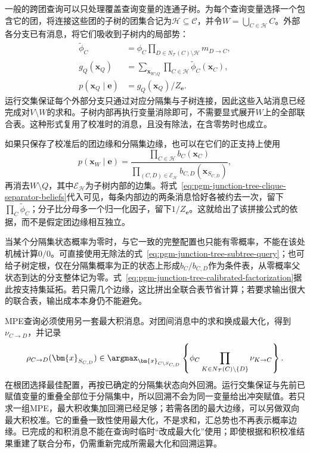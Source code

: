 一般的跨团查询可以只处理覆盖查询变量的连通子树。为每个查询变量选择一个包含它的团，将连接这些团的子树的团集合记为$\mathcal{H}\subseteq\mathcal{C}$，并令$W=\bigcup_{C\in\mathcal{H}}C$。外部各分支已有消息，将它们吸收到子树内的局部势：
\begin{equation}
  \begin{aligned}
    \widetilde{\phi}_C
      &=\phi_C
        \prod_{D\in N_{\mathcal{T}}(C)\setminus\mathcal{H}}m_{D\to C},\\
    g_Q(\bm{x}_Q)
      &=\sum_{\bm{x}_{W\setminus Q}}
         \prod_{C\in\mathcal{H}}\widetilde{\phi}_C(\bm{x}_C),\\
    p(\bm{x}_Q\mid\bm{e})&=g_Q(\bm{x}_Q)/Z_{\bm{e}}.
  \end{aligned}
  \label{eq:pgm-junction-tree-subtree-query}
\end{equation}
运行交集保证每个外部分支只通过对应分隔集与子树连接，因此这些入站消息已经完成对$V\setminus W$的求和。子树内部再执行变量消除即可，不需要显式展开$W$上的全部联合表。这种形式复用了校准时的消息，且没有除法，在含零势时也成立。

如果只保存了校准后的团边缘和分隔集边缘，也可以在它们的正支持上使用
\begin{equation}
  p(\bm{x}_W\mid\bm{e})
    =\frac{\prod_{C\in\mathcal{H}}b_C(\bm{x}_C)}
           {\prod_{(C,D)\in\mathcal{E}_{\mathcal{H}}}
                b_{C,D}(\bm{x}_{S_{C,D}})},
  \label{eq:pgm-junction-tree-calibrated-factorization}
\end{equation}
再消去$W\setminus Q$，其中$\mathcal{E}_{\mathcal{H}}$为子树内部的边集。将式~\eqref{eq:pgm-junction-tree-clique-separator-beliefs}代入可见，每条内部边的两条消息恰好各被约去一次，留下$\prod_C\widetilde{\phi}_C$；分子比分母多一个归一化因子，留下$1/Z_{\bm{e}}$。这就给出了该拼接公式的依据，而不是假定团边缘相互独立。

当某个分隔集状态概率为零时，与它一致的完整配置也只能有零概率，不能在该处机械计算$0/0$。可直接使用无除法的式~\eqref{eq:pgm-junction-tree-subtree-query}；也可给子树定根，仅在分隔集概率为正的状态上形成$b_C/b_{C,D}$作为条件表，从零概率父状态到达的分支整体记为零。式~\eqref{eq:pgm-junction-tree-calibrated-factorization}据此按支持集延拓。若只需几个边缘，这比拼出全联合表节省计算；若要求输出很大的联合表，输出成本本身仍不能避免。

MPE查询必须使用另一套最大积消息。对团间消息中的求和换成最大化，得到$\nu_{C\to D}$，并记录
\begin{equation}
  \rho_{C\to D}(\bm{x}_{S_{C,D}})
    \in\argmax_{\bm{x}_{C\setminus S_{C,D}}}
       \left\{\phi_C
          \prod_{K\in N_{\mathcal{T}}(C)\setminus\{D\}}\nu_{K\to C}\right\}.
  \label{eq:pgm-junction-tree-clique-backpointer}
\end{equation}
在根团选择最佳配置，再按已确定的分隔集状态向外回溯。运行交集保证与先前已赋值变量的重叠全部位于分隔集中，所以回溯不会为同一变量给出冲突赋值。若只求一组MPE，最大积收集加回溯已经足够；若需各团的最大边缘，可以另做双向最大积校准。它的重叠一致性使用最大化，不是求和，汇总势也不再表示概率边缘。已完成的和积消息不能在查询时临时“改成最大化”使用；即使根据和积校准结果重建了联合分布，仍需重新完成所需最大化和回溯运算。

